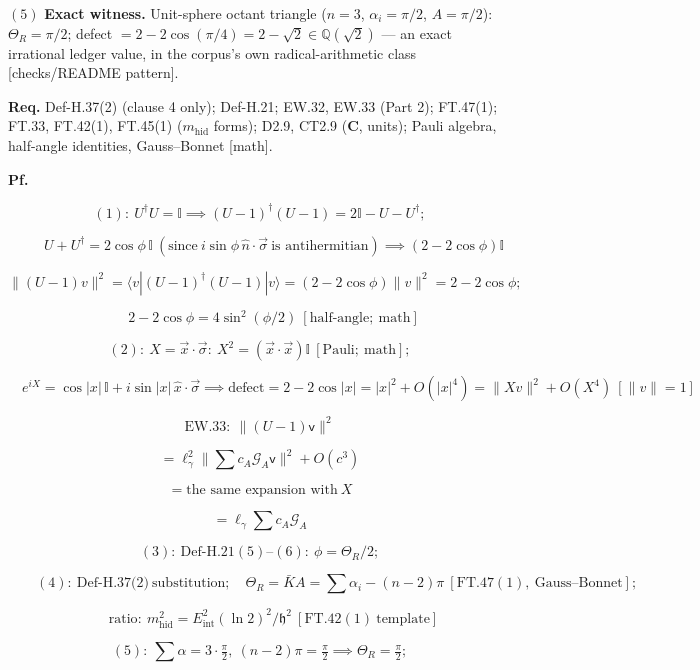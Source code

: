 \begin{theorem}
$(5)$ \textbf{Exact witness.} Unit-sphere octant triangle ($n=3$, $\alpha_i=\pi/2$, $A=\pi/2$): $\Theta_R=\pi/2$; defect $=2-2\cos(\pi/4)=2-\sqrt2\in\mathbb Q(\sqrt2)$ — an exact irrational ledger value, in the corpus's own radical-arithmetic class [checks/README pattern].

\textbf{Req.} Def-H.37(2) (clause 4 only); Def-H.21; EW.32, EW.33 (Part 2); FT.47(1); FT.33, FT.42(1), FT.45(1) ($m_{\mathrm{hid}}$ forms); D2.9, CT2.9 (\textbf{C}, units); Pauli algebra, half-angle identities, Gauss–Bonnet [math].

\textbf{Pf.}

\[
(1):\ U^\dagger U=\mathbb I\implies(U-1)^\dagger(U-1)=2\mathbb I-U-U^\dagger;
\]

\[
\qquad U+U^\dagger=2\cos\phi\,\mathbb I\ (\text{since}\ i\sin\phi\,\hat n\cdot\vec\sigma\ \text{is antihermitian})\implies(2-2\cos\phi)\mathbb I
\]

\[
\|(U-1)v\|^2=\langle v|(U-1)^\dagger(U-1)|v\rangle=(2-2\cos\phi)\|v\|^2=2-2\cos\phi;
\]

\[
\qquad 2-2\cos\phi=4\sin^2(\phi/2)\ [\text{half-angle};\ \text{math}]
\]

\[
(2):\ X=\vec x\cdot\vec\sigma:\ X^2=(\vec x\cdot\vec x)\mathbb I\ [\text{Pauli};\ \text{math}];
\]

\[
\quad e^{iX}=\cos|x|\,\mathbb I+i\sin|x|\,\hat x\cdot\vec\sigma\implies\text{defect}=2-2\cos|x|=|x|^2+O(|x|^4)=\|Xv\|^2+O(X^4)\ [\|v\|=1]
\]

\[
\mathrm{EW.33}:\ \|(U-1)\mathsf v\|^2
\]

\[
= \ell_\gamma^2\|\textstyle\sum c_A\mathcal G_A\mathsf v\|^2+O(c^3)
\]

\[
= \text{the same expansion with}\ X
\]

\[
= \ell_\gamma\textstyle\sum c_A\mathcal G_A
\]

\[
(3):\ \text{Def-H.21}(5)\text{--}(6):\ \phi=\Theta_R/2;
\]

\[
\qquad (4):\ \text{Def-H.37(2)}\ \text{substitution};\quad\Theta_R=\bar KA=\sum\alpha_i-(n-2)\pi\ [\mathrm{FT.47}(1),\ \text{Gauss–Bonnet}];
\]

\[
\qquad \text{ratio}:\ m_{\mathrm{hid}}^2=E_{\mathrm{int}}^2(\ln2)^2/\mathfrak h^2\ [\mathrm{FT.42}(1)\ \text{template}]
\]

\[
(5):\ \sum\alpha=3\cdot\tfrac\pi2,\ (n-2)\pi=\tfrac\pi2\implies\Theta_R=\tfrac\pi2;
\]


\end{theorem}
